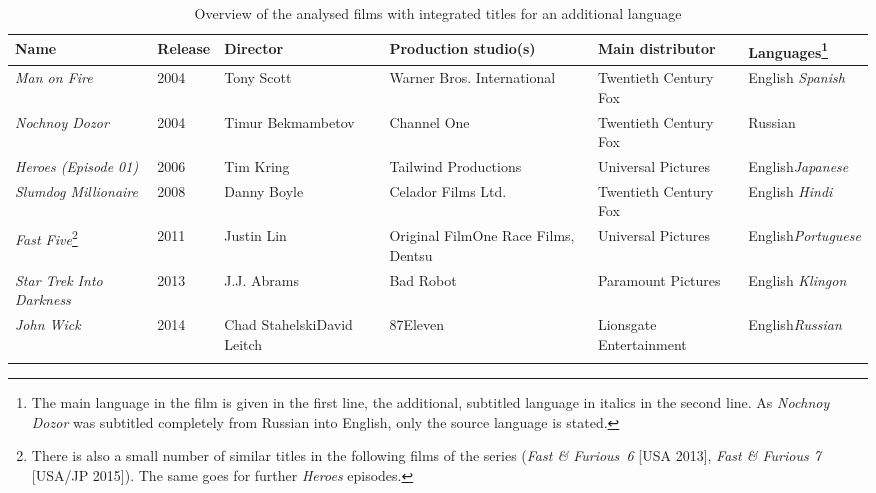 \begin{table}[b]
\small
\begin{tabularx}{\textwidth}{L{18mm}L{11mm}@{\,}Q@{\,}QQp{15mm}}
\lsptoprule
 \bfseries Name &  Release &  Director &  Production studio(s) &  Main distributor &  Languages\footnote{The main language in the film is given in the first line, the additional, subtitled language in italics in the second line. As \textit{Nochnoy Dozor} was subtitled completely from Russian into English, only the source language is stated.}\\
 \midrule 
 \itshape Man on Fire & 2004 & Tony Scott & Warner Bros. International & Twentieth Century Fox & English \newline\textit{Spanish}\\
 \tablevspace 
 \itshape Nochnoy Dozor & 2004 & Timur Bekmambetov & Channel One & Twentieth Century Fox & Russian\\
 \tablevspace 
 \itshape Heroes \itshape (Episode 01) & 2006 & Tim Kring & Tailwind Productions & Universal Pictures & English\newline \textit{Japanese}\\
 \tablevspace 
 \itshape Slumdog Millionaire & 2008 & Danny Boyle & Celador Films Ltd. & Twentieth Century Fox & English \newline  \textit{Hindi}\\
 \tablevspace 
 \textit{Fast Five}\footnote{There 
  is also a small number of similar titles in the following films of the series (\textit{Fast \& Furious~6} [USA 2013], \textit{Fast \& Furious 7} [USA/JP 2015]). The same goes for further \textit{Heroes} episodes.
  } 
  & 2011 & Justin Lin & Original Film\newline  One Race Films, Dentsu & Universal Pictures & English\newline \textit{Portuguese}\\
 \tablevspace 
 \itshape Star Trek Into Darkness & 2013 & J.J. Abrams & Bad Robot & Paramount Pictures & English \textit{ Klingon}\\
 \tablevspace 
 \itshape John Wick & 2014 & Chad Stahelski\newline  David Leitch & 87Eleven & Lionsgate Entertainment & English\newline  \textit{Russian}\\
\lspbottomrule
\end{tabularx} 
\caption{Overview of the analysed films with integrated titles for an additional language}
\label{tab:TAB9}
\end{table}

